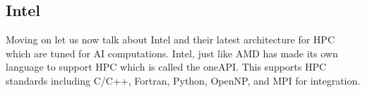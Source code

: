 \documentclass[12pt]{article}
\begin{document}
\subsection{Intel}
Moving on let us now talk about Intel and their latest architecture for HPC which are tuned for AI computations. Intel, just like AMD has made its own language to support HPC which is called the oneAPI. This supports HPC standards including C/C++, Fortran, Python, OpenNP, and MPI for integration.

\end{document}
